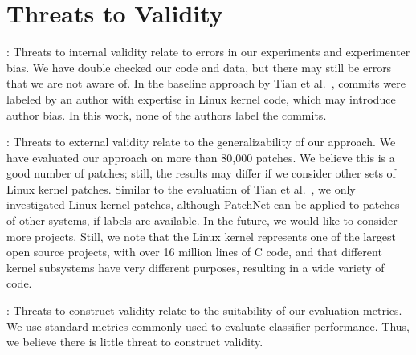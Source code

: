 \section{Threats to Validity}
\label{sec:threat}

: Threats to internal validity relate to
errors in our experiments and experimenter bias. We have double checked our
code and data, but there may still be errors that we are not aware of. In
the baseline approach by Tian et al.~\cite{tian2012identifying}, commits
were labeled by an author with expertise in Linux kernel code, which may
introduce author bias. In this work, none of the authors label the commits.

\vspace{0.1cm}: Threats to external
validity relate to the generalizability of our approach. We have evaluated
our approach on more than 80,000 patches. We believe this is a good number
of patches; still, the results may differ if we consider other sets of
Linux kernel patches. Similar to the evaluation of Tian et
al.~\cite{tian2012identifying}, we only investigated Linux kernel patches,
although PatchNet can be applied to patches of other systems, if
labels are available. In the
future, we would like to consider more projects.
Still, we note that the Linux kernel represents one of the largest open
source projects, with over 16 million lines of C code, and that different
kernel subsystems have very different purposes, resulting in a wide variety
of code.

\vspace{0.1cm}: Threats to construct validity relate to the suitability of our evaluation metrics. We use standard metrics commonly used to evaluate classifier performance. Thus, we believe there is little threat to construct validity.




